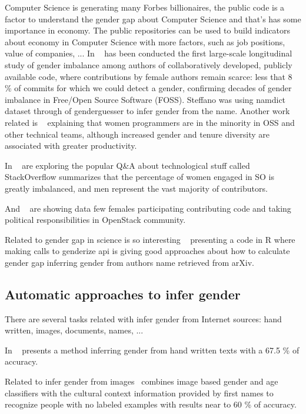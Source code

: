 \documentclass[a4paper]{article}
\begin{document}
Computer Science is generating many Forbes billionaires, the public
code is a factor to understand the gender gap about Computer Science
and that's has some importance in economy. The public repositories can
be used to build indicators about economy in Computer Science with
more factors, such as job positions, value of companies, ... In
~\cite{zacchiroli2020gender} has been conducted the first large-scale
longitudinal study of gender imbalance among authors of
collaboratively developed, publicly available code, where
contributions by female authors remain scarce: less that 8 \% of
commits for which we could detect a gender, confirming decades of
gender imbalance in Free/Open Source Software (FOSS). Steffano was
using namdict dataset through of genderguesser to infer gender from
the name. Another work related is ~\cite{vasilescu2015gender}
explaining that women programmers are in the minority in OSS and other
technical teams, although increased gender and tenure diversity are
associated with greater productivity.

In ~\cite{vasilescu2012gender} are exploring the popular Q\&A about
technological stuff called StackOverflow summarizes that the
percentage of women engaged in SO is greatly imbalanced, and men
represent the vast majority of contributors.

And ~\cite{izquierdo2018openstack} are showing data few females
participating contributing code and taking political responsibilities
in OpenStack community.

Related to gender gap in science is so interesting
~\cite{holman2018gender} presenting a code in R where making calls to
genderize api is giving good approaches about how to calculate gender
gap inferring gender from authors name retrieved from arXiv.

\subsection{Automatic approaches to infer gender}

There are several tasks related with infer gender from Internet
sources: hand written, images, documents, names, ...

In ~\cite{liwicki2011automatic} presents a method inferring gender from
hand written texts with a 67.5 \% of accuracy.

Related to infer gender from images~\cite{gallagher2008estimating}
combines image based gender and age classifiers with the cultural
context information provided by first names to recognize people with
no labeled examples with results near to 60 \% of accuracy.
\end{document}

